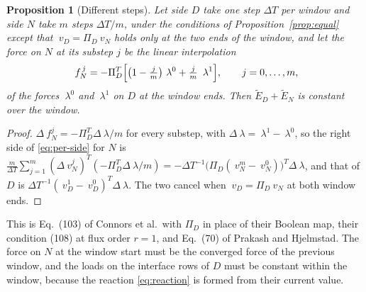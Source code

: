 \documentclass[11pt]{article}
\newtheorem{proposition}{Proposition}
\begin{document}
\begin{proposition}[Different steps]
\label{prop:subcycled}
Let side $D$ take one step $\Delta T$ per window and side $N$ take $m$
steps $\Delta T/m$, under the conditions of Proposition~\ref{prop:equal}
except that $~v_D = \Pi_D ~v_N$ holds only at the two ends of the window,
and let the force on $N$ at its substep $j$ be the linear interpolation
\begin{equation}
  ~f_N^{\,j} = -\Pi_D^T \Bigl[\bigl(1 - \tfrac{j}{m}\bigr)~\lambda^0
             + \tfrac{j}{m}\, ~\lambda^1\Bigr], \qquad j = 0, \dots, m,
  \label{eq:interpolated-force}
\end{equation}
of the forces $~\lambda^0$ and $~\lambda^1$ on $D$ at the window ends. Then
$\tilde{E}_D + \tilde{E}_N$ is constant over the window.
\end{proposition}
\begin{proof}
$\Delta ~f_N^j = -\Pi_D^T \Delta~\lambda / m$ for every substep, with
$\Delta~\lambda = ~\lambda^1 - ~\lambda^0$, so the right side of
\eqref{eq:per-side} for $N$ is
$\frac{m}{\Delta T}\sum_{j=1}^{m} (\Delta ~v_N^j)^T(-\Pi_D^T \Delta~\lambda/m)
= -\Delta T^{-1}\bigl(\Pi_D(~v_N^m - ~v_N^0)\bigr)^T \Delta~\lambda$, and
that of $D$ is $\Delta T^{-1}(~v_D^1 - ~v_D^0)^T \Delta~\lambda$. The two
cancel when $~v_D = \Pi_D ~v_N$ at both window ends.
\end{proof}

This is Eq.~(103) of Connors et al.\ with $\Pi_D$ in place of their Boolean
map, their condition (108) at flux order $r = 1$, and Eq.~(70) of Prakash
and Hjelmstad. The force on $N$ at the window start must be the converged
force of the previous window, and the loads on the interface rows of $D$
must be constant within the window, because the reaction
\eqref{eq:reaction} is formed from their current value.
\end{document}
